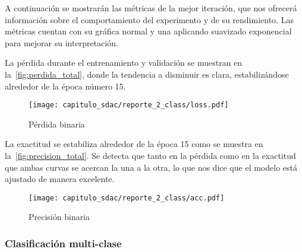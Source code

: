 \begin{table}[H]
    \centering
    \caption{Estadísticos del experimento binario}\label{tabla:estadisticos}
    \end{table}

A continuación se mostrarán las métricas de la mejor iteración, que nos ofrecerá
información sobre el comportamiento del experimento y de su rendimiento. Las
métricas cuentan con su gráfica normal y una aplicando suavizado exponencial
para mejorar su interpretación.

La pérdida durante el entrenamiento y validación se muestran en
la~\autoref{fig:perdida_total}, donde la tendencia a disminuir es clara,
estabilizándose alrededor de la época número 15.

\begin{figure}[H]
    \centering
    \texttt{[image: capitulo\_sdac/reporte\_2\_class/loss.pdf]}
    \caption{Pérdida binaria}\label{fig:perdida_total}
\end{figure}

La exactitud se estabiliza alrededor de la época 15 como se muestra en
la~\autoref{fig:precision_total}. Se detecta que tanto en la pérdida como en la
exactitud que ambas curvas se acercan la una a la otra, lo que nos dice que el
modelo está ajustado de manera excelente.

\begin{figure}[H]
    \centering
    \texttt{[image: capitulo\_sdac/reporte\_2\_class/acc.pdf]}
    \caption{Precisión binaria}\label{fig:precision_total}
\end{figure}
    
\subsubsection{Clasificación multi-clase}

